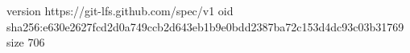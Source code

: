 version https://git-lfs.github.com/spec/v1
oid sha256:e630e2627fcd2d0a749ccb2d643eb1b9e0bdd2387ba72c153d4dc93c03b31769
size 706
